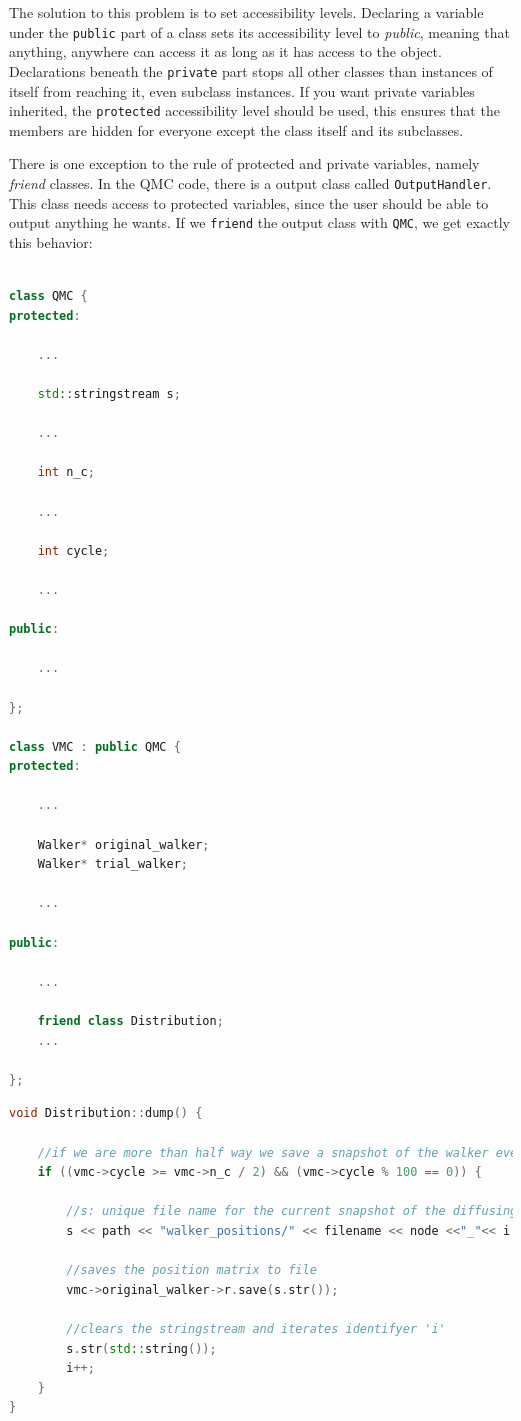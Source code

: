 The solution to this problem is to set accessibility levels. Declaring a variable under the \verb+public+ part of a class sets its accessibility level to \textit{public}, meaning that anything, anywhere can access it as long as it has access to the object. Declarations beneath the \verb+private+ part stops all other classes than instances of itself from reaching it, even subclass instances. If you want private variables inherited, the \verb+protected+ accessibility level should be used, this ensures that the members are hidden for everyone except the class itself and its subclasses.

There is one exception to the rule of protected and private variables, namely \textit{friend} classes. In the QMC code, there is a output class called \verb+OutputHandler+. This class needs access to protected variables, since the user should be able to output anything he wants. If we \verb+friend+ the output class with \verb+QMC+, we get exactly this behavior: 

\vspace{0.5 cm}
\begin{lstlisting}[language=c++]

class QMC {
protected:
    
    ...
    
    std::stringstream s; 
    
    ...
    
    int n_c;

    ...

    int cycle;

    ...

public:

    ...

};

class VMC : public QMC {
protected:

    ...

    Walker* original_walker;
    Walker* trial_walker;

    ...

public:

    ...

    friend class Distribution;
    ...

};
\end{lstlisting}

\begin{lstlisting}[language=c++]
void Distribution::dump() {

    //if we are more than half way we save a snapshot of the walker every 100'th step
    if ((vmc->cycle >= vmc->n_c / 2) && (vmc->cycle % 100 == 0)) {
        
        //s: unique file name for the current snapshot of the diffusing walker
        s << path << "walker_positions/" << filename << node <<"_"<< i <<".arma";
        
        //saves the position matrix to file
        vmc->original_walker->r.save(s.str());
        
        //clears the stringstream and iterates identifyer 'i'
        s.str(std::string());
        i++;
    }
}
\end{lstlisting}

